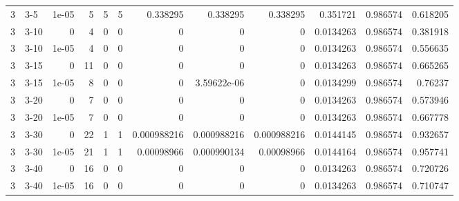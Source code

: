 \begin{tabular}{rlrrrrrrrrrr}
     3 & 3-5    &      1e-05 &           5 &                 5 &                 5 &     0.338295    &     0.338295    &      0.338295    &        0.351721  &               0.986574 &           0.618205 \\
     3 & 3-10   &      0     &           4 &                 0 &                 0 &     0           &     0           &      0           &        0.0134263 &               0.986574 &           0.381918 \\
     3 & 3-10   &      1e-05 &           4 &                 0 &                 0 &     0           &     0           &      0           &        0.0134263 &               0.986574 &           0.556635 \\
     3 & 3-15   &      0     &          11 &                 0 &                 0 &     0           &     0           &      0           &        0.0134263 &               0.986574 &           0.665265 \\
     3 & 3-15   &      1e-05 &           8 &                 0 &                 0 &     0           &     3.59622e-06 &      0           &        0.0134299 &               0.986574 &           0.76237  \\
     3 & 3-20   &      0     &           7 &                 0 &                 0 &     0           &     0           &      0           &        0.0134263 &               0.986574 &           0.573946 \\
     3 & 3-20   &      1e-05 &           7 &                 0 &                 0 &     0           &     0           &      0           &        0.0134263 &               0.986574 &           0.667778 \\
     3 & 3-30   &      0     &          22 &                 1 &                 1 &     0.000988216 &     0.000988216 &      0.000988216 &        0.0144145 &               0.986574 &           0.932657 \\
     3 & 3-30   &      1e-05 &          21 &                 1 &                 1 &     0.00098966  &     0.000990134 &      0.00098966  &        0.0144164 &               0.986574 &           0.957741 \\
     3 & 3-40   &      0     &          16 &                 0 &                 0 &     0           &     0           &      0           &        0.0134263 &               0.986574 &           0.720726 \\
     3 & 3-40   &      1e-05 &          16 &                 0 &                 0 &     0           &     0           &      0           &        0.0134263 &               0.986574 &           0.710747 \\

\end{tabular}
